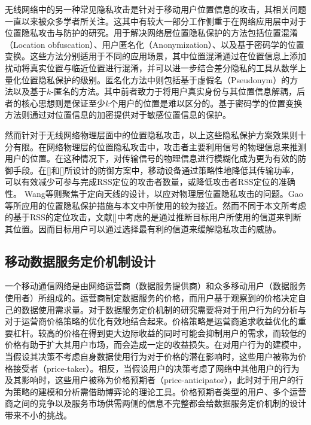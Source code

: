 无线网络中的另一种常见隐私攻击是针对于移动用户位置信息的攻击，其相关问题一直以来被众多学者所关注。这其中有较大一部分工作侧重于在网络应用层中对于位置隐私攻击与防护的研究。用于解决网络层位置隐私保护的方法包括位置混淆（Location obfuscation）\cite{Agrawal:Privacy}、用户匿名化（Anonymization）\cite{Beresford:Mix, Gongjournal, Shin:AnonySense}、以及基于密码学的位置变换\cite{Ghinita:Private, Khoshgozaran:Blind}。这些方法分别适用于不同的应用场景，其中位置混淆通过在位置信息上添加扰动将真实位置与临近位置进行混淆，并可以进一步结合差分隐私的工具从数学上量化位置隐私保护的级别\cite{Dwork}。匿名化方法中则包括基于虚假名（Pseudonym）的方法\cite{Beresford:Mix}以及基于$k$-匿名的方法\cite{Shin:AnonySense}。其中前者致力于将用户真实身份与其位置信息解耦，后者的核心思想则是保证至少$k$个用户的位置是难以区分的。基于密码学的位置变换方法则通过对位置信息的加密提供对于敏感位置信息的保护。

然而针对于无线网络物理层面中的位置隐私攻击，以上这些隐私保护方案效果则十分有限。在网络物理层的位置隐私攻击中，攻击者主要利用信号的物理信息来推测用户的位置。在这种情况下，对传输信号的物理信息进行模糊化成为更为有效的防御手段。在[]和[]所设计的防御方案中，移动设备通过策略性地降低其传输功率，可以有效减少可参与完成RSS定位的攻击者数量，或降低攻击者RSS定位的准确性。 Wang等\cite{Ting11}则聚焦于定向天线的设计，以应对物理层位置隐私攻击的问题。Gao等\cite{location}所应用的位置隐私保护措施与本文中所使用的较为接近。然而不同于本文所考虑的基于RSS的定位攻击，文献[]中考虑的是通过推断目标用户所使用的信道来判断其位置。因而目标用户可以通过选择最有利的信道来缓解隐私攻击的威胁。


\subsection{移动数据服务定价机制设计}

一个移动通信网络是由网络运营商（数据服务提供商）和众多移动用户（数据服务使用者）所组成的。运营商制定数据服务的价格，而用户基于观察到的价格决定自己的数据使用需求量。对于数据服务定价机制的研究需要将对于用户行为的分析与对于运营商价格策略的优化有效地结合起来。价格策略是运营商追求收益优化的重要杠杆。较高的价格在得到更大边际收益的同时可能会抑制用户的需求，而较低的价格有助于扩大其用户市场，而会造成一定的收益损失。在对用户行为的建模中，当假设其决策不考虑自身数据使用行为对于价格的潜在影响时，这些用户被称为价格接受者（price-taker）。相反，当假设用户的决策考虑了网络中其他用户的行为及其影响时，这些用户被称为价格预期者（price-anticipator），此时对于用户的行为策略的建模和分析需借助博弈论的理论工具。价格预期者类型的用户、多个运营商之间的竞争以及服务市场供需两侧的信息不完整都会给数据服务定价机制的设计带来不小的挑战。

